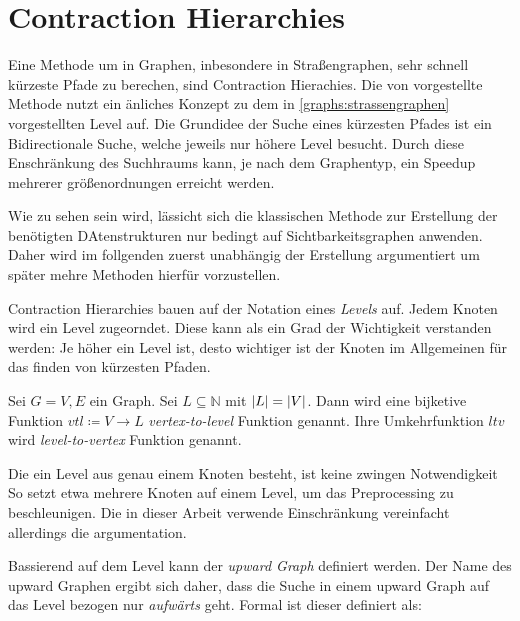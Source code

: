 \chapter{Contraction Hierarchies}\label{chapter:ch}

Eine Methode um in Graphen, inbesondere in Straßengraphen, sehr schnell kürzeste Pfade zu berechen, sind Contraction Hierachies.
Die von \cite{geisberger2008contraction} vorgestellte Methode nutzt ein änliches Konzept zu dem in \autoref{graphs:strassengraphen} vorgestellten Level auf.
Die Grundidee der Suche eines kürzesten Pfades ist ein Bidirectionale Suche, welche jeweils nur höhere Level besucht.
Durch diese Enschränkung des Suchhraums kann, je nach dem Graphentyp, ein Speedup mehrerer größenordnungen erreicht werden.

Wie zu sehen sein wird, lässicht sich die klassischen Methode zur Erstellung der benötigten DAtenstrukturen nur bedingt auf Sichtbarkeitsgraphen anwenden.
Daher wird im follgenden zuerst unabhängig der Erstellung argumentiert um später mehre Methoden hierfür vorzustellen.

Contraction Hierarchies bauen auf der Notation eines \emph{Levels} auf.
Jedem Knoten wird ein Level zugeorndet.
Diese kann als ein Grad der Wichtigkeit verstanden werden:
Je höher ein Level ist, desto wichtiger ist der Knoten im Allgemeinen für das finden von kürzesten Pfaden.

\begin{definition}[Level]
    Sei $G = V, E$ ein Graph.
    Sei $L \subseteq \mathbb{N}$ mit $\abs{L} = \abs{V}$.
    Dann wird eine bijketive Funktion ${vtl} \coloneq V \to L$ \emph{vertex-to-level} Funktion genannt.
    Ihre Umkehrfunktion ${ltv}$ wird \emph{level-to-vertex} Funktion genannt.
\end{definition}

Die ein Level aus genau einem Knoten besteht, ist keine zwingen Notwendigkeit
So setzt \cite{vetter2009parallel} etwa mehrere Knoten auf einem Level, um das Preprocessing zu beschleunigen.
Die in dieser Arbeit verwende Einschränkung vereinfacht allerdings die argumentation.

Bassierend auf dem Level kann der \emph{upward Graph} definiert werden.
Der Name des upward Graphen ergibt sich daher, dass die Suche in einem upward Graph auf das Level bezogen nur \emph{aufwärts} geht.
Formal ist dieser definiert als:

